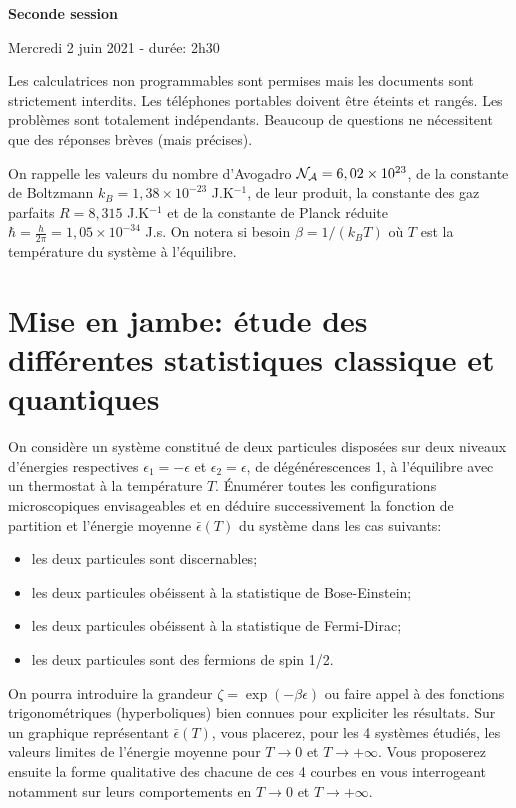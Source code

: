 \documentclass[utf8, 11pt]{feuille}
\begin{document}
\begin{center}
    \Large {\bf Seconde session}
    
    Mercredi 2 juin 2021 - durée: 2h30
\end{center}

Les calculatrices non programmables sont permises mais les documents sont strictement interdits.
Les téléphones portables doivent être éteints et rangés. Les  problèmes sont totalement indépendants. Beaucoup de questions ne nécessitent que des réponses brèves (mais précises).  

On rappelle les valeurs du nombre d'Avogadro ${\cal N_A}=6,02 \times 10^{23}$, de la constante de Boltzmann $k_B=1,38 \times 10^{-23}$ J.K$^{-1}$, de leur produit, la constante des gaz parfaits $R=8,315$ J.K$^{-1}$ et de la constante de Planck réduite $\hbar=\frac{h}{2\pi}=1,05 \times 10^{-34}$ J.s.  
On notera si besoin $\beta=1/(k_B T)$ où $T$ est la température du système à  l'équilibre.



\section{Mise en jambe: étude des différentes statistiques classique et quantiques}

On considère un système constitué de deux particules disposées sur deux niveaux d'énergies respectives $\epsilon_1=-\epsilon$ et $\epsilon_2=\epsilon$, de dégénérescences 1, à  l'équilibre avec un thermostat à  la température $T$.
\'Enumérer toutes les configurations microscopiques envisageables et en déduire successivement la fonction de partition et l'énergie moyenne $\bar{\epsilon}(T)$ du système dans les cas suivants:
\begin{itemize}
\item les deux particules sont discernables;
\item les deux particules obéissent à  la statistique de Bose-Einstein;
\item les deux particules obéissent à  la statistique de Fermi-Dirac;
\item les deux particules sont des fermions de spin 1/2.
\end{itemize}
On pourra introduire la grandeur $\zeta=\exp(-\beta \epsilon)$ ou faire appel à  des fonctions trigonométriques (hyperboliques) bien connues pour expliciter les résultats. Sur un graphique représentant $\bar{\epsilon} (T)$, vous placerez, pour les 4 systèmes étudiés, les valeurs limites de l'énergie moyenne pour $T \rightarrow 0$ et $T \rightarrow +\infty$. Vous proposerez ensuite la forme qualitative des chacune de ces 4 courbes en vous interrogeant notamment sur leurs comportements en $T \rightarrow 0$ et $T \rightarrow +\infty$.
\end{document}
